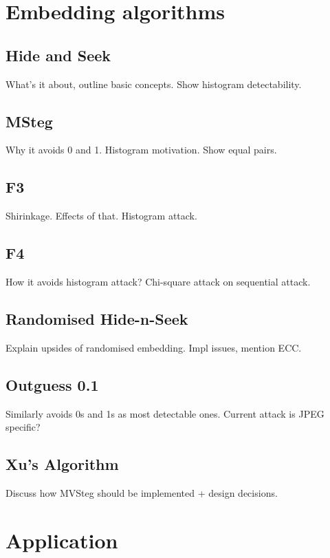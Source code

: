 \documentclass[12pt,british,twoside,notitlepage,usenames,dvipsnames,hypens,final]{report}
\numberwithin{equation}{section}
\numberwithin{figure}{section}
\begin{document}
\section{Embedding algorithms}
\label{emb-alg}

\subsection{Hide and Seek}

What's it about, outline basic concepts. Show histogram detectability.

\subsection{MSteg}

Why it avoids 0 and 1. Histogram motivation. Show equal pairs.

\subsection{F3}

Shirinkage. Effects of that. Histogram attack.

\subsection{F4}

How it avoids histogram attack? Chi-square attack on sequential attack.

\subsection{Randomised Hide-n-Seek}

Explain upsides of randomised embedding. Impl issues, mention ECC. 

\subsection{Outguess 0.1}

Similarly avoids 0s and 1s as most detectable ones. Current attack is JPEG specific?

\subsection{Xu's Algorithm}
\label{xu-alg}

Discuss how MVSteg should be implemented + design decisions.

\section{Application}
\end{document}
